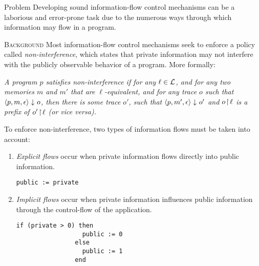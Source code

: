 \documentclass[final]{beamer}
\newlength{\onecolwid}
\begin{document}
\begin{frame}[fragile]
\begin{columns}[t]
\begin{column}{\onecolwid}
\begin{alertblock}{Problem}
    Developing sound information-flow control mechanisms can be a laborious and error-prone task due to the numerous ways through which information may flow in a program.
\end{alertblock}

\begin{block}{\textsc{Background}}
    Most information-flow control mechanisms seek to enforce a policy called \emph{non-interference}, which states that private information may not interfere with the publicly observable behavior of a program. More formally:
    \vspace{-0.31cm}
    \begin{alertblock}{}
        \textit{A program $p$ satisfies non-interference if for any $\ell \in {\cal L}$, and for any two memories $m$ and $m'$ that are $\ell$-equivalent, and for any trace $o$ such that $\langle p, m, \epsilon \rangle\downarrow_{}o $, then there is some trace $o'$, such that $\langle p, m', \epsilon \rangle\downarrow_{}o'$ and ${o \! \upharpoonright \! {\ell}}$ is a prefix of ${o' \! \upharpoonright \! {\ell}}$ (or vice versa).}
    \end{alertblock}
    \vspace{-1cm}
    \color{black}
    
    
    To enforce non-interference, two types of information flows must be taken into account: 
    \begin{enumerate}
        \item{\emph{Explicit flows} occur when private information flows directly into public information.
            \begin{lstlisting}[label=listing:explicit-flow,gobble=15]
                public := private
            \end{lstlisting}} 
        \item{\emph{Implicit flows} occur when private information influences public information through the control-flow of the application.
            \begin{lstlisting}[label=listing:implicit-flow,gobble=15]
                if (private > 0) then
                  public := 0
                else
                  public := 1
                end
            \end{lstlisting}}
    \end{enumerate}
\end{block}



\end{column}
\end{columns}
\end{frame}
\end{document}
